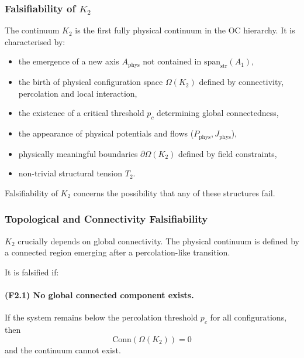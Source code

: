 
\subsubsection{Falsifiability of \texorpdfstring{$K_2$}{K_2}}
\label{sec:falsifiability-k2}

The continuum $K_2$ is the first fully physical continuum in the OC
hierarchy.  
It is characterised by:
\begin{itemize}
    \item the emergence of a new axis $A_{\mathrm{phys}}$ not contained
    in $\mathrm{span}_{\mathrm{str}}(A_1)$,
    \item the birth of physical configuration space $\Omega(K_2)$ defined
    by connectivity, percolation and local interaction,
    \item the existence of a critical threshold $p_c$ determining global
    connectedness,
    \item the appearance of physical potentials and flows
    ($P_{\mathrm{phys}}, J_{\mathrm{phys}}$),
    \item physically meaningful boundaries $\partial\Omega(K_2)$ defined
    by field constraints,
    \item non-trivial structural tension $T_2$.
\end{itemize}

Falsifiability of $K_2$ concerns the possibility that any of these
structures fail.



\subsubsection{Topological and Connectivity Falsifiability}

$K_2$ crucially depends on global connectivity.  
The physical continuum is defined by a connected region emerging after a
percolation-like transition.

It is falsified if:

\paragraph{(F2.1) No global connected component exists.}
If the system remains below the percolation threshold $p_c$ for all
configurations, then
\[
\mathrm{Conn}(\Omega(K_2)) = 0
\]
and the continuum cannot exist.


